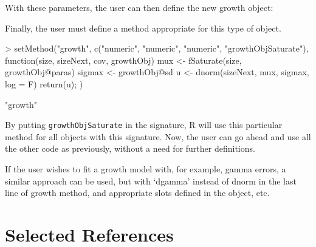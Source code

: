 \documentclass{article}
\begin{document}
With these parameters, the user can then define the new growth object:

\begin{Schunk}
\end{Schunk}

Finally, the user must define a method appropriate for this type of object. 

\begin{Schunk}
\begin{Sinput}
> setMethod("growth", c("numeric", "numeric", "numeric", "growthObjSaturate"), 
            function(size, sizeNext, cov, growthObj){
                mux <- fSaturate(size, growthObj@paras)
                sigmax <- growthObj@sd
                u <- dnorm(sizeNext, mux, sigmax, log = F)  
                return(u);
            })
\end{Sinput}
\begin{Soutput}
[1] "growth"
\end{Soutput}
\end{Schunk}
By putting {\tt growthObjSaturate} in the signature, R will use this particular method for all objects with this signature. Now, the user can go ahead and use all the other code as previously, without a need for further definitions. 

If the user wishes to fit a growth model with, for example, gamma errors, a similar approach can be used, but with `dgamma' instead of dnorm in the last line of growth method, and appropriate slots defined in the object, etc. 

\section*{Selected References}
\end{document}
